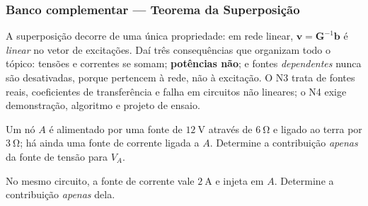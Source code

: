 
\subsubsection*{Banco complementar --- Teorema da Superposição}

\begin{atencao}
A superposição decorre de uma única propriedade: em rede linear,
$\mathbf{v}=\mathbf{G}^{-1}\mathbf{b}$ é \emph{linear} no vetor de excitações.
Daí três consequências que organizam todo o tópico: tensões e correntes se
somam; \textbf{potências não}; e fontes \emph{dependentes} nunca são desativadas,
porque pertencem à rede, não à excitação. O N3 trata de fontes reais,
coeficientes de transferência e falha em circuitos não lineares; o N4 exige
demonstração, algoritmo e projeto de ensaio.
\end{atencao}

\blocofixacao

\begin{questao}[1]{}
Um nó $A$ é alimentado por uma fonte de $\SI{12}{\volt}$ através de
$\SI{6}{\ohm}$ e ligado ao terra por $\SI{3}{\ohm}$; há ainda uma fonte de
corrente ligada a $A$. Determine a contribuição \emph{apenas} da fonte de
tensão para $V_A$.
\end{questao}

\begin{questao}[1]{}
No mesmo circuito, a fonte de corrente vale $\SI{2}{\ampere}$ e injeta em $A$.
Determine a contribuição \emph{apenas} dela.
\end{questao}


